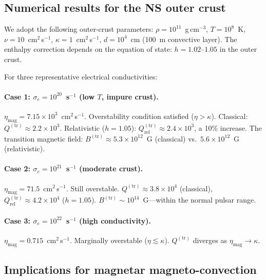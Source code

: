 \subsection{Numerical results for the NS outer crust}
\label{subsec:rel-46-Qtr-numerical}

We adopt the following outer-crust parameters:
$\rho = 10^{11}$~g\,cm$^{-3}$, $T = 10^8$~K,
$\nu = 10$~cm$^2$\,s$^{-1}$, $\kappa = 1$~cm$^2$\,s$^{-1}$,
$d = 10^4$~cm (100~m convective layer).  The enthalpy correction
depends on the equation of state: $h = 1.02$--$1.05$ in the
outer crust.

For three representative electrical conductivities:

\paragraph{Case 1: $\sigma_e = 10^{20}$~s$^{-1}$ (low $T$,
impure crust).}
$\eta_{\mathrm{mag}} = 7.15 \times 10^3$~cm$^2$\,s$^{-1}$.
Overstability condition satisfied ($\eta > \kappa$).
Classical: $Q^{(\mathrm{tr})} \approx 2.2 \times 10^3$.
Relativistic ($h = 1.05$): $Q^{(\mathrm{tr})}_{\mathrm{rel}}
\approx 2.4 \times 10^3$, a 10\% increase.
The transition magnetic field:
$B^{(\mathrm{tr})} \approx 5.3 \times 10^{12}$~G (classical)
vs.\ $5.6 \times 10^{12}$~G (relativistic).

\paragraph{Case 2: $\sigma_e = 10^{21}$~s$^{-1}$ (moderate crust).}
$\eta_{\mathrm{mag}} = 71.5$~cm$^2$\,s$^{-1}$.
Still overstable.
$Q^{(\mathrm{tr})} \approx 3.8 \times 10^4$ (classical),
$Q^{(\mathrm{tr})}_{\mathrm{rel}} \approx 4.2 \times 10^4$
($h = 1.05$).
$B^{(\mathrm{tr})} \sim 10^{14}$~G---within the normal pulsar
range.

\paragraph{Case 3: $\sigma_e = 10^{22}$~s$^{-1}$ (high
conductivity).}
$\eta_{\mathrm{mag}} = 0.715$~cm$^2$\,s$^{-1}$.
Marginally overstable ($\eta \lesssim \kappa$).
$Q^{(\mathrm{tr})}$ diverges as
$\eta_{\mathrm{mag}} \to \kappa$.

\subsection{Implications for magnetar magneto-convection}
\label{subsec:rel-46-Qtr-implications}

